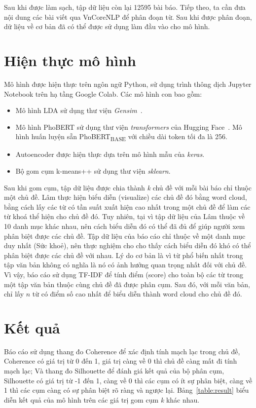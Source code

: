 Sau khi được làm sạch, tập dữ liệu còn lại 12595 bài báo. Tiếp theo, ta cần đưa
nội dung các bài viết qua VnCoreNLP để phân đoạn từ. Sau khi được phân đoạn, dữ
liệu về cơ bản đã có thể được sử dụng làm đầu vào cho mô hình.

\section{Hiện thực mô hình}
Mô hình được hiện thực trên ngôn ngữ Python, sử dụng trình thông dịch Jupyter
Notebook trên hạ tầng Google Colab. Các mô hình con bao gồm:

\begin{itemize}
    \item Mô hình LDA sử dụng thư viện
        \textit{Gensim}~\cite{GensimTopicModelling2021}.
    \item Mô hình PhoBERT sử dụng thư viện \textit{transformers} của Hugging
        Face~\cite{wolfTransformersStateoftheArtNatural2020}. Mô hình huấn
        luyện sẵn PhoBERT\textsubscript{BASE} với chiều dài token tối đa là
        256.
    \item Autoencoder được hiện thực dựa trên mô hình mẫu của \textit{keras}.
    \item Bộ gom cụm k-means++ sử dụng thư viện \textit{sklearn}.
\end{itemize}

Sau khi gom cụm, tập dữ liệu được chia thành \textit{k} chủ đề với mỗi bài báo
chỉ thuộc một chủ đề. Lâm \cite{lamGomCumVan2021} thực hiện biểu diễn
(visualize) các chủ đề đó bằng word cloud, bằng cách lấy các từ có tần suất
xuất hiện cao nhất trong một chủ đề để làm các từ khoá thể hiện cho chủ đề đó.
Tuy nhiên, tại vì tập dữ liệu của Lâm \cite{lamGomCumVan2021} thuộc về 10 danh
mục khác nhau, nên cách biểu diễn đó có thể đã đủ để giúp người xem phân biệt
được các chủ đề. Tập dữ liệu của báo cáo chỉ thuộc về một danh mục duy nhất
(Sức khoẻ), nên thực nghiệm cho cho thấy cách biểu diễn đó khó có thể phân biệt
được các chủ đề với nhau. Lý do cơ bản là vì từ phổ biến nhất trong tập văn bản
không có nghĩa là nó có ảnh hưởng quan trọng nhất đối với chủ đề. Vì vậy, báo
cáo sử dụng TF-IDF để tính điểm (score) cho toàn bộ các từ trong một tập văn
bản thuộc cùng chủ đề đã được phân cụm. Sau đó, với mỗi văn bản, chỉ lấy $n$ từ
có điểm số cao nhất để biểu diễn thành word cloud cho chủ đề đó.

\section{Kết quả}
Báo cáo sử dụng thang đo Coherence để xác định tính mạch lạc trong chủ đề,
Coherence có giá trị từ 0 đến 1, giá trị càng về 0 thì chủ đề càng mất đi tính
mạch lạc; Và thang đo Silhouette để đánh giá kết quả của bộ phân cụm,
Silhouette có giá trị từ -1 đến 1, càng về 0 thì các cụm có ít sự phân biệt,
càng về 1 thì các cụm càng có sự phân biệt rõ ràng và ngược lại.
Bảng~\ref{table:result} biểu diễn kết quả của mô hình trên các giá trị gom cụm
\textit{k} khác nhau.

